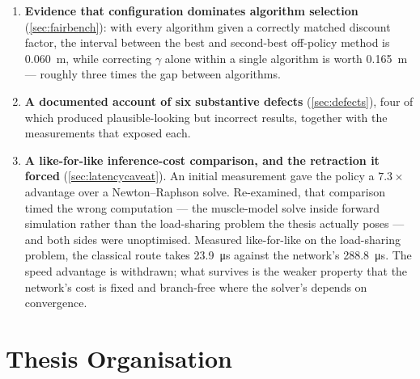 \begin{enumerate}[label=\textbf{C\arabic*.}, leftmargin=2.2em]
        This contribution replaces one claimed by earlier drafts --- that the
        \SAC{} target entropy of $-\dim(\mathcal{A})$ imposed the error plateau.
        That hypothesis was mechanistically plausible and supported by the
        clustering of the best search trials, and it was wrong: the same ablation
        shows the target entropy recovers $-8$\,\% of the gap, i.e.\ nothing
        (\cref{sec:ablation}). It is reported in full in this thesis as a
        negative result rather than removed.
  \item \textbf{Evidence that configuration dominates algorithm selection}
        (\cref{sec:fairbench}): with every algorithm given a correctly matched
        discount factor, the interval between the best and second-best off-policy
        method is \SI{0.060}{\meter}, while correcting $\gamma$ alone within a
        single algorithm is worth \SI{0.165}{\meter} --- roughly three times the
        gap between algorithms.
  \item \textbf{A documented account of six substantive defects}
        (\cref{sec:defects}), four of which produced plausible-looking but
        incorrect results, together with the measurements that exposed each.
  \item \textbf{A like-for-like inference-cost comparison, and the retraction it
        forced} (\cref{sec:latencycaveat}). An initial measurement gave the policy
        a $7.3\times$ advantage over a Newton--Raphson solve. Re-examined, that
        comparison timed the wrong computation --- the muscle-model solve inside
        forward simulation rather than the load-sharing problem the thesis
        actually poses --- and both sides were unoptimised. Measured
        like-for-like on the load-sharing problem, the classical route takes
        \SI{23.9}{\micro\second} against the network's \SI{288.8}{\micro\second}.
        The speed advantage is withdrawn; what survives is the weaker property
        that the network's cost is fixed and branch-free where the solver's
        depends on convergence.
\end{enumerate}

\section{Thesis Organisation}

